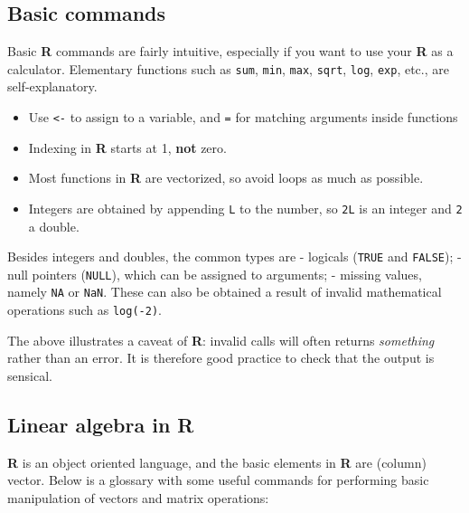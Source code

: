 \documentclass[]{book}
\providecommand{\tightlist}{%
  \setlength{\itemsep}{0pt}\setlength{\parskip}{0pt}}
\begin{document}
\subsection{Basic commands}\label{basic-commands}

Basic \textbf{R} commands are fairly intuitive, especially if you want
to use your \textbf{R} as a calculator. Elementary functions such as
\texttt{sum}, \texttt{min}, \texttt{max}, \texttt{sqrt}, \texttt{log},
\texttt{exp}, etc., are self-explanatory.

\begin{itemize}
\tightlist
\item
  Use \texttt{\textless{}-} to assign to a variable, and \texttt{=} for
  matching arguments inside functions
\item
  Indexing in \textbf{R} starts at 1, \textbf{not} zero.
\item
  Most functions in \textbf{R} are vectorized, so avoid loops as much as
  possible.
\item
  Integers are obtained by appending \texttt{L} to the number, so
  \texttt{2L} is an integer and \texttt{2} a double.
\end{itemize}

Besides integers and doubles, the common types are - logicals
(\texttt{TRUE} and \texttt{FALSE}); - null pointers (\texttt{NULL}),
which can be assigned to arguments; - missing values, namely \texttt{NA}
or \texttt{NaN}. These can also be obtained a result of invalid
mathematical operations such as \texttt{log(-2)}.

The above illustrates a caveat of \textbf{R}: invalid calls will often
returns \emph{something} rather than an error. It is therefore good
practice to check that the output is sensical.

\subsection{\texorpdfstring{Linear algebra in
\textbf{R}}{Linear algebra in R}}\label{linear-algebra-in-r}

\textbf{R} is an object oriented language, and the basic elements in
\textbf{R} are (column) vector. Below is a glossary with some useful
commands for performing basic manipulation of vectors and matrix
operations:
\end{document}
